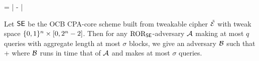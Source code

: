 \bnm
\AdvROR{\SE}{\advA} = \left| -  \right| 
\enm

\begin{theorem}
Let ${\mathsf{SE}}$ be the OCB CPA-core scheme built from tweakable cipher
$\tilde{{\cal E}}$ with tweak space $\{0,1\}^n\times[0,2^n-2]$.
Then for any $\textnormal{ROR}_{\mathsf{SE}}$-adversary ${\mathcal A}$
making at most $q$ queries with aggregate length at most $\sigma$
blocks, we give an adversary ${\mathcal B}$ such that
\bnm
  \AdvROR{\SE}{\advA} \le \AdvTPRP{\tweakCipher}{\advB} + 
\enm
where ${\mathcal B}$ runs in time that of ${\mathcal A}$ and makes at most $\sigma$ queries.
\end{theorem}



